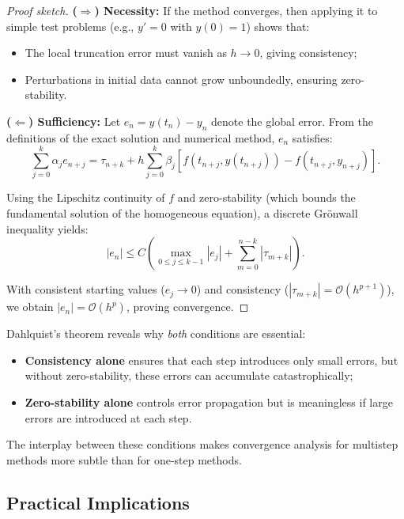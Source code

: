 \begin{proof}[Proof sketch]
  \textbf{($\Rightarrow$) Necessity:}
  If the method converges, then applying it to simple test problems (e.g., $y' = 0$ with $y(0) = 1$) shows that:
  \begin{itemize}
    \item The local truncation error must vanish as $h \to 0$, giving consistency;
    \item Perturbations in initial data cannot grow unboundedly, ensuring zero-stability.
  \end{itemize}

  \textbf{($\Leftarrow$) Sufficiency:}
  Let $e_n = y(t_n) - y_n$ denote the global error. From the definitions of the exact solution and numerical method, $e_n$ satisfies:
  \[
    \sum_{j=0}^k \alpha_j e_{n+j} = \tau_{n+k} + h \sum_{j=0}^k \beta_j [f(t_{n+j}, y(t_{n+j})) - f(t_{n+j}, y_{n+j})].
  \]

  Using the Lipschitz continuity of $f$ and zero-stability (which bounds the fundamental solution of the homogeneous equation), a discrete Grönwall inequality yields:
  \[
    |e_n| \leq C \left( \max_{0 \leq j \leq k-1} |e_j| + \sum_{m=0}^{n-k} |\tau_{m+k}| \right).
  \]

  With consistent starting values ($e_j \to 0$) and consistency ($|\tau_{m+k}| = \mathcal{O}(h^{p+1})$), we obtain $|e_n| = \mathcal{O}(h^p)$, proving convergence.
\end{proof}

\begin{remark}
  Dahlquist's theorem reveals why \emph{both} conditions are essential:
  \begin{itemize}
    \item \textbf{Consistency alone} ensures that each step introduces only small errors, but without zero-stability, these errors can accumulate catastrophically;
    \item \textbf{Zero-stability alone} controls error propagation but is meaningless if large errors are introduced at each step.
  \end{itemize}
  The interplay between these conditions makes convergence analysis for multistep methods more subtle than for one-step methods.
\end{remark}

\subsection{Practical Implications}
\label{sec:lmm:practical-convergence}

